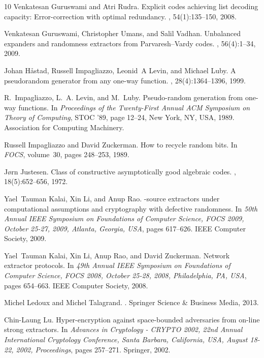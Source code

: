 \documentclass[10pt,a4paper]{article}
\newcommand{\1}{\mathbbm{1}}
\begin{document}
\begin{thebibliography}{10}
Venkatesan Guruswami and Atri Rudra.
\newblock Explicit codes achieving list decoding capacity: Error-correction
  with optimal redundancy.
, 54(1):135--150, 2008.

Venkatesan Guruswami, Christopher Umans, and Salil Vadhan.
\newblock Unbalanced expanders and randomness extractors from
  {Parvaresh--Vardy} codes.
, 56(4):1--34, 2009.

Johan H{\aa}stad, Russell Impagliazzo, Leonid~A Levin, and Michael Luby.
\newblock A pseudorandom generator from any one-way function.
, 28(4):1364--1396, 1999.

R.~Impagliazzo, L.~A. Levin, and M.~Luby.
\newblock Pseudo-random generation from one-way functions.
\newblock In {\em Proceedings of the Twenty-First Annual ACM Symposium on
  Theory of Computing}, STOC '89, page 12–24, New York, NY, USA, 1989.
  Association for Computing Machinery.

Russell Impagliazzo and David Zuckerman.
\newblock How to recycle random bits.
\newblock In {\em FOCS}, volume~30, pages 248--253, 1989.

J{\o}rn Justesen.
\newblock Class of constructive asymptotically good algebraic codes.
, 18(5):652--656, 1972.

Yael~Tauman Kalai, Xin Li, and Anup Rao.
-source extractors under computational assumptions and cryptography
  with defective randomness.
\newblock In {\em 50th Annual {IEEE} Symposium on Foundations of Computer
  Science, {FOCS} 2009, October 25-27, 2009, Atlanta, Georgia, {USA}}, pages
  617--626. {IEEE} Computer Society, 2009.

Yael~Tauman Kalai, Xin Li, Anup Rao, and David Zuckerman.
\newblock Network extractor protocols.
\newblock In {\em 49th Annual {IEEE} Symposium on Foundations of Computer
  Science, {FOCS} 2008, October 25-28, 2008, Philadelphia, PA, {USA}}, pages
  654--663. {IEEE} Computer Society, 2008.

Michel Ledoux and Michel Talagrand.
.
\newblock Springer Science \& Business Media, 2013.

Chin{-}Laung Lu.
\newblock Hyper-encryption against space-bounded adversaries from on-line
  strong extractors.
\newblock In {\em Advances in Cryptology - {CRYPTO} 2002, 22nd Annual
  International Cryptology Conference, Santa Barbara, California, USA, August
  18-22, 2002, Proceedings}, pages 257--271. Springer, 2002.


\end{thebibliography}
\end{document}
